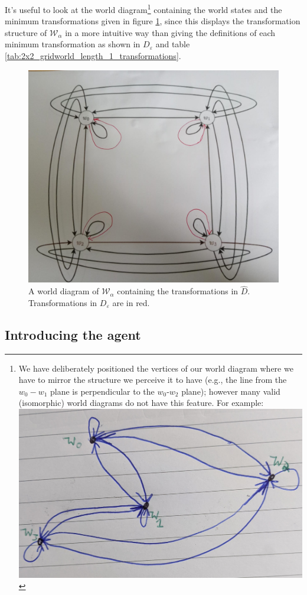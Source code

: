 It's useful to look at the world diagram\footnote{
We have deliberately positioned the vertices of our world diagram where we have to mirror the structure we perceive it to have (e.g., the line from the $w_{0}-w_{1}$ plane is perpendicular to the $w_{0}$-$w_{2}$ plane); however many valid (isomorphic) world diagrams do not have this feature.
For example:
\includegraphics[width=0.5\linewidth]{2MathematicalFramework/Images/2x2_cyclical_min_trans_quirky.jpg}
}
containing the world states and the minimum transformations given in figure \ref{fig:2x2_cyclical_minimum_transformations}, since this displays the transformation structure of $\mathscr{W}_{\alpha}$ in a more intuitive way than giving the definitions of each minimum transformation as shown in $D_{\varepsilon}$ and table \ref{tab:2x2_gridworld_length_1_transformations}.

\begin{figure}[H]
	\centering
	\includegraphics[width=0.5\linewidth]{2MathematicalFramework/Images/2x2_cyclical_minimum_transformations.jpeg}
	\caption{
		A world diagram of $\mathscr{W}_{\alpha}$ containing the transformations in $\hat{D}$.
		Transformations in $D_{\varepsilon}$ are in red.
	}
	\label{fig:2x2_cyclical_minimum_transformations}
\end{figure}


\subsection{Introducing the agent}

